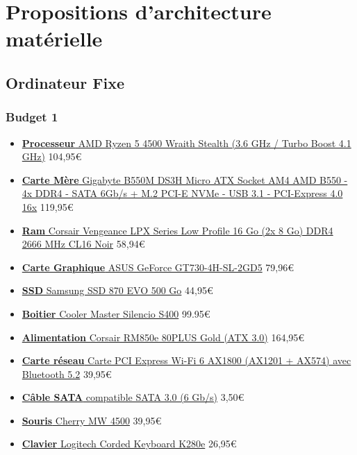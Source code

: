 \chapter{Propositions d'architecture matérielle}

\section{Ordinateur Fixe}

\subsection{Budget 1}

\begin{itemize}
	\item \href{https://www.ldlc.com/fiche/PB00497548.html}{\textbf{Processeur} AMD Ryzen 5 4500 Wraith Stealth (3.6 GHz / Turbo Boost 4.1 GHz)} 104,95\euro
	\item \href{https://www.ldlc.com/fiche/PB00346172.html}{\textbf{Carte Mère} Gigabyte B550M DS3H Micro ATX Socket AM4 AMD B550 - 4x DDR4 - SATA 6Gb/s + M.2 PCI-E NVMe - USB 3.1 - PCI-Express 4.0 16x} 119,95\euro
	\item \href{https://www.ldlc.com/fiche/PB00191551.html}{\textbf{Ram} Corsair Vengeance LPX Series Low Profile 16 Go (2x 8 Go) DDR4 2666 MHz CL16 Noir} 58,94\euro
	\item \href{https://www.ldlc.com/fiche/PB00462561.html}{\textbf{Carte Graphique} ASUS GeForce GT730-4H-SL-2GD5} 79,96\euro
	\item \href{https://www.ldlc.com/fiche/PB00402115.html}{\textbf{SSD} Samsung SSD 870 EVO 500 Go} 44,95\euro
	\item \href{https://www.ldlc.com/fiche/PB00275652.html}{\textbf{Boitier} Cooler Master Silencio S400} 99.95\euro
	\item \href{https://www.ldlc.com/fiche/PB00548770.html}{\textbf{Alimentation} Corsair RM850e 80PLUS Gold (ATX 3.0)} 164,95\euro
	\item \href{https://www.ldlc.com/fiche/PB00487856.html}{\textbf{Carte réseau} Carte PCI Express Wi-Fi 6 AX1800 (AX1201 + AX574) avec Bluetooth 5.2} 39,95\euro
	\item \href{https://www.ldlc.com/fiche/PB00016236.html}{\textbf{Câble SATA} compatible SATA 3.0 (6 Gb/s)} 3,50\euro
	\item \href{https://www.ldlc.com/fiche/PB00243882.html}{\textbf{Souris} Cherry MW 4500} 39,95\euro
	\item \href{https://www.ldlc.com/fiche/PB00242405.html}{\textbf{Clavier} Logitech Corded Keyboard K280e} 26,95\euro

\end{itemize}
